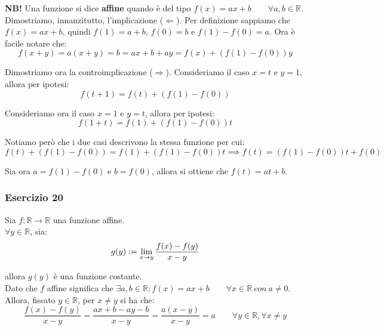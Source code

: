 \documentclass{article}
\begin{document}
\noindent\textbf{NB!} Una funzione si dice \textbf{affine} quando è del tipo $f(x) = ax + b \qquad \forall a, b \in \mathbb{R}$.\\

\noindent Dimostriamo, innanzitutto, l'implicazione ($\Leftarrow$). Per definizione sappiamo che $f(x) = ax + b$, quindi $f(1) = a + b$, $f(0) = b$ e $f(1) - f(0) = a$. Ora è facile notare che:
\begin{equation*}
    f(x + y) = a(x + y) = b = ax + b + ay = f(x) + (f(1) - f(0))y
\end{equation*}

\noindent Dimostriamo ora la controimplicazione ($\Rightarrow$). Consideriamo il caso $x = t$ e $y = 1$, allora per ipotesi:
\begin{equation*}
    f(t + 1) = f(t) + (f(1) - f(0))
\end{equation*}

\noindent Consideriamo ora il caso $x = 1$ e $y = t$, allora per ipotesi:
\begin{equation*}
    f(1 + t) = f(1) + (f(1) - f(0))t
\end{equation*}

\noindent Notiamo però che i due casi descrivono la stessa funzione per cui:
\begin{equation*}
    f(t) + (f(1) - f(0)) = f(1) + (f(1) - f(0))t \implies f(t) = (f(1) - f(0))t + f(0)
\end{equation*}

\noindent Sia ora $a = f(1) - f(0)$ e $b = f(0)$, allora si ottiene che $f(t) = at + b$.

\subsubsection{Esercizio 20}
Sia $f: \mathbb{R} \xrightarrow{} \mathbb{R}$ una funzione affine.\\
$\forall y \in \mathbb{R}$, sia:
\begin{equation*}
    g(y) \vcentcolon = \lim_{x \to y} \frac{f(x) - f(y)}{x - y}
\end{equation*}

\noindent allora $g(y)$ è una funzione costante.\\

\noindent Dato che $f$ affine significa che $\exists a, b \in \mathbb{R} : f(x) = ax + b \qquad \forall x \in \mathbb{R} \ con \ a \neq 0$. Allora, fissato $y \in \mathbb{R}$, per $x \neq y$ si ha che:
\begin{equation*}
    \frac{f(x) - f(y)}{x - y} = \frac{ax + b - ay - b}{x - y} = \frac{a(x - y)}{x - y} = a \qquad \forall y \in \mathbb{R}, \forall x \neq y
\end{equation*}
\end{document}
